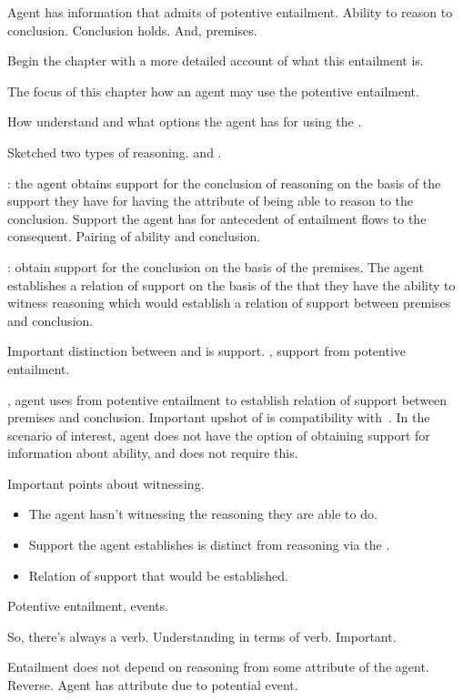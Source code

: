 \begin{note}
  Agent has information that admits of potentive entailment.
  Ability to reason to conclusion.
  Conclusion holds.
  And, premises.

  Begin the chapter with a more detailed account of what this entailment is.

  The focus of this chapter how an agent may use the potentive entailment.

  How understand and what options the agent has for using the \gen{}.

  Sketched two types of reasoning.
  \AR{} and \WR{}.

  \AR{}: the agent obtains support for the conclusion of reasoning on the basis of the support they have for having the attribute of being able to reason to the conclusion.
  Support the agent has for antecedent of entailment flows to the consequent.
  Pairing of ability and conclusion.

  \WR{}: obtain support for the conclusion on the basis of the premises.
  The agent establishes a relation of support on the basis of the \gen{} that they have the ability to witness reasoning which would establish a relation of support between premises and conclusion.

  Important distinction between \AR{} and \WR{} is support.
  \AR{}, support from potentive entailment.

  \WR{}, agent uses \gen{} from potentive entailment to establish relation of support between premises and conclusion.
  Important upshot of \WR{} is compatibility with~\nI{}.
  In the scenario of interest, agent does not have the option of obtaining support for information about ability, and \WR{} does not require this.

  Important points about witnessing.
  \begin{itemize}
  \item The agent hasn't witnessing the reasoning they are able to do.
  \item Support the agent establishes is distinct from reasoning via the \gen{}.
  \item Relation of support that would be established.
  \end{itemize}

  Potentive entailment, events.

  So, there's always a verb.
  Understanding in terms of verb.
  Important.

  Entailment does not depend on reasoning from some attribute of the agent.
  Reverse.
  Agent has attribute due to potential event.


\end{note}
